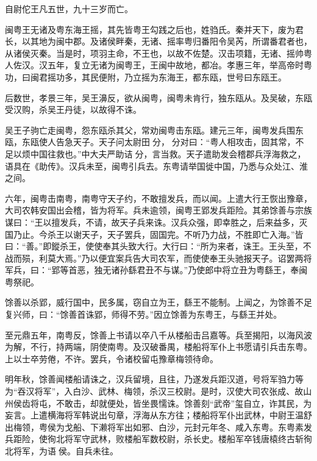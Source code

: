 \documentclass[12pt,UTF8]{ctexbook}
\begin{document}
自尉佗王凡五世，九十三岁而亡。



闽粤王无诸及粤东海王摇，其先皆粤王勾践之后也，姓驺氏。秦并天下，废为君长，以其地为闽中郡。及诸侯畔秦，无诸、摇率粤归番阳令吴芮，所谓番君者也，从诸侯灭秦。当是时，项羽主命，不王也，以故不佐楚。汉击项籍，无诸、摇帅粤人佐汉。汉五年，复立无诸为闽粤王，王闽中故地，都冶。孝惠三年，举高帝时粤功，曰闽君摇功多，其民便附，乃立摇为东海王，都东瓯，世号曰东瓯王。



后数世，孝景三年，吴王濞反，欲从闽粤，闽粤未肯行，独东瓯从。及吴破，东瓯受汉购，杀吴王丹徒，以故得不诛。



吴王子驹亡走闽粤，怨东瓯杀其父，常劝闽粤击东瓯。建元三年，闽粤发兵围东瓯，东瓯使人告急天子。天子问太尉田分，分对曰：“粤人相攻击，固其常，不足以烦中国往救也。”中大夫严助诘分，言当救。天子遣助发会稽郡兵浮海救之，语具在《助传》。汉兵未至，闽粤引兵去。东粤请举国徙中国，乃悉与众处江、淮之间。



六年，闽粤击南粤，南粤守天子约，不敢擅发兵，而以闻。上遣大行王恢出豫章，大司农韩安国出会稽，皆为将军。兵未逾领，闽粤王郢发兵距险。其弟馀善与宗族谋曰：“王以擅发兵，不请，故天子兵来诛。汉兵众强，即幸胜之，后来益多，灭国乃止。今杀王以谢天子，天子罢兵，固国完。不听乃力战，不胜即亡入海。”皆曰：“善。”即鏦杀王，使使奉其头致大行。大行曰：“所为来者，诛王。王头至，不战而殒，利莫大焉。”乃以便宜案兵告大司农军，而使使奉王头驰报天子。诏罢两将军兵，曰：“郢等首恶，独无诸孙繇君丑不与谋。”乃使郎中将立丑为粤繇王，奉闽粤祭祀。



馀善以杀郢，威行国中，民多属，窃自立为王，繇王不能制。上闻之，为馀善不足复兴师，曰：“馀善首诛郢，师得不劳。”因立馀善为东粤王，与繇王并处。



至元鼎五年，南粤反，馀善上书请以卒八千从楼船击吕嘉等。兵至揭阳，以海风波为解，不行，持两端，阴使南粤。及汉破番禺，楼船将军仆上书愿请引兵击东粤。上以士卒劳倦，不许。罢兵，令诸校留屯豫章梅领待命。



明年秋，馀善闻楼船请诛之，汉兵留境，且往，乃遂发兵距汉道，号将军驺力等为“吞汉将军”，入白沙、武林、梅领，杀汉三校尉。是时，汉使大司农张成、故山州侯齿将屯，不敢击，却就便处，皆坐畏懦诛。馀善刻“武帝”玺自立，诈其民，为妄言。上遣横海将军韩说出句章，浮海从东方往；楼船将军仆出武林，中尉王温舒出梅领，粤侯为戈船、下濑将军出如邪、白沙，元封元年冬、咸入东粤。东粤素发兵距险，使徇北将军守武林，败楼船军数校尉，杀长史。楼船军卒钱唐榬终古斩徇北将军，为语侯。自兵未往。
\end{document}
